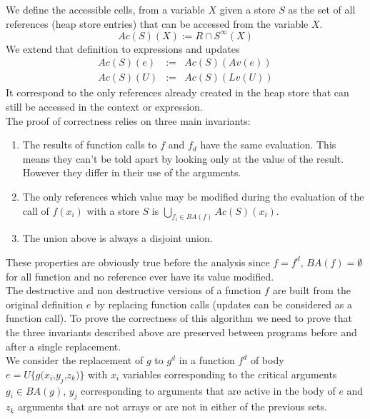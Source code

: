 \documentclass[12pt,a4paper]{article}
\newcommand{\cl}[1]{\texttt{#1}}
\newcommand{\ucont}[1]{\{#1\}}
\begin{document}
We define the accessible cells, from a variable $X$ given a store $S$ as the set of all references (heap store entries) that can be accessed from the variable $X$.
$$ Ac(S)(X) := R \cap S^{\infty}(X)$$
We extend that definition to expressions and updates
\begin{eqnarray*}
Ac(S)(e) &:=& Ac(S)( Av(e) ) \\
Ac(S)(U) &:=& Ac(S)( Lv(U) )
\end{eqnarray*}
It correspond to the only references already created in the heap store that can still be accessed in the context or expression. \\

The proof of correctness relies on three main invariants:
\begin{enumerate}
\item The results of function calls to $f$ and $f_d$ have the same evaluation. This means they can't be told apart by looking only at the value of the result. However they differ in their use of the arguments.
\item The only references which value may be modified during the evaluation of the call of $f(x_i)$ with a store $S$ is $\bigcup_{f_i \in BA(f)} Ac(S)(x_i)$.
\item The union above is always a disjoint union.
\end{enumerate}
These properties are obviously true before the analysis since $f = f^d$, $BA(f) = \emptyset$ for all function and no reference ever have its value modified.\\

The destructive and non destructive versions of a function $f$ are built from the original definition $e$ by replacing function calls (updates can be considered as a function call). To prove the correctness of this algorithm we need to prove that the three invariants described above are preserved between programs before and after a single replacement. \\

We consider the replacement of $g$ to $g^d$ in a function $f^d$ of body $e =  U\ucont{g\cl{(}x_i \cl{,} y_j \cl{,} z_k \cl{)}}$ with $x_i$ variables corresponding to the critical arguments $g_i \in BA(g)$, $y_j$ corresponding to arguments that are active in the body of $e$ and $z_k$ arguments that are not arrays or are not in either of the previous sets. \\
\end{document}
